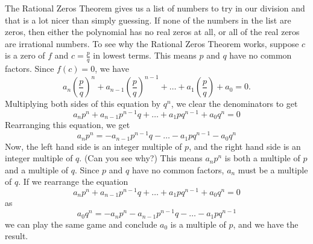 
\smallskip


\smallskip

The Rational Zeros Theorem gives us a list of numbers to try in our  division and that is a lot nicer than simply guessing.  If none of the numbers in the list are zeros, then either the polynomial has no real zeros at all, or all of the real zeros are irrational numbers.  To see why the Rational Zeros Theorem works, suppose $c$ is a zero of $f$ and $c = \frac{p}{q}$ in lowest terms.  This means $p$ and $q$ have no common factors.  Since $f(c) = 0$, we have 
\[
a_{n} \left(\frac{p}{q}\right)^{n} + a_{n-1}\left(\frac{p}{q}\right)^{n-1} + \ldots + a_{1} \left(\frac{p}{q}\right) + a_{0} = 0.
\]  
Multiplying both sides of this equation by $q^n$, we clear the denominators to get 
\[
a_{n}p^{n} + a_{n-1}p^{n-1}q + \ldots + a_{1}p q^{n-1} + a_{0}q^n = 0
\]  
Rearranging this equation, we get  
\[
a_{n}p^{n} = -a_{n-1}p^{n-1}q - \ldots - a_{1}p q^{n-1} -a_{0}q^n
\] 
Now, the left hand side is an integer multiple of $p$, and the right hand side is an integer multiple of $q$. (Can you see why?)  This means $a_{n}p^{n}$ is both a multiple of $p$ and a multiple of $q$.  Since $p$ and $q$ have no common factors, $a_{n}$ must be a multiple of $q$.  If we rearrange the equation 
\[
a_{n}p^{n} + a_{n-1}p^{n-1}q + \ldots + a_{1}p q^{n-1} + a_{0}q^n = 0
\] 
as 
\[
a_{0}q^n = -a_{n}p^{n} - a_{n-1}p^{n-1}q - \ldots - a_{1}p q^{n-1}
\] 
we can play the same game and conclude $a_{0}$ is a multiple of $p$, and we have the result.

\medskip

